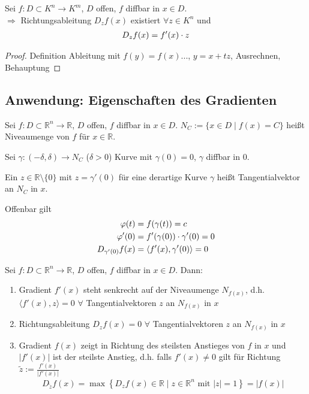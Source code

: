 \begin{proposition}
	Sei $f:D\subset K^n\to K^m$, $D$ offen, $f$ diffbar in $x\in D$.\\
	$\Rightarrow$ Richtungsableitung $D_zf(x)$ existiert $\forall z\in K^n$ und 
	\begin{align}
		D_zf(x) = f'(x) \cdot z\notag
	\end{align}
\end{proposition}

\begin{proof}
	Definition Ableitung mit $f(y) = f(x) ...$, $y=x+tz$, Ausrechnen, Behauptung
\end{proof}

\subsection{Anwendung: Eigenschaften des Gradienten}
\begin{*definition}[Niveaumenge]
	Sei $f:D\subset\mathbb{R}^n\to \mathbb{R}$, $D$ offen, $f$ diffbar in $x\in D$.
	$N_C:= \{ x\in D \mid f(x) = C \}$ heißt Niveaumenge von $f$ für $x\in \mathbb{R}$.
\end{*definition}	

\begin{*definition}[Tangentialvektor]
	Sei $\gamma: (-\delta, \delta)\to N_C$ ($\delta > 0$) Kurve mit $\gamma(0) = 0$, $\gamma$ diffbar in $0$.
	
	Ein $z\in\mathbb{R}\setminus \{0\}$ mit $z = \gamma'(0)$ für eine derartige Kurve $\gamma$ heißt Tangentialvektor an $N_C$ in $x$.
	
	Offenbar gilt
	\begin{align}
		\phi(t) &= f(\gamma(t)) = c \notag \\
		\phi'(0) &= f'(\gamma(0))\cdot \gamma'(0) = 0 \notag \\
		D_{\gamma'(0)}f(x) &= \langle f'(x),\gamma'(0)\rangle = 0\notag
	\end{align}
\end{*definition}

\begin{proposition}
	Sei $f:D\subset\mathbb{R}^n\to\mathbb{R}$, $D$ offen, $f$ \gls{diffbar} in $x\in D$. Dann:
\begin{enumerate}[label={\arabic*)}]
	\item Gradient $f'(x)$ steht senkrecht auf der Niveaumenge $N_{f(x)}$, d.h. $\langle f'(x), z\rangle = 0$ $\forall$ Tangentialvektoren $z$ an $N_{f(x)}$ in $x$
	\item Richtungsableitung $D_zf(x) = 0$ $\forall$ Tangentialvektoren $z$ an $N_{f(x)}$ in $x$
	\item Gradient $f(x)$ zeigt in Richtung des steilsten Anstieges von $f$ in $x$ und $\vert f'(x)\vert$ ist der steilste Anstieg, d.h. falls $f'(x)\neq 0$ gilt für Richtung $\tilde{z} := \frac{f'(x)}{\vert f'(x)\vert}$ \begin{align*}
		D_{\tilde{z}} f(x) = \max \left\lbrace D_z f(x) \in\mathbb{R} \mid z\in\mathbb{R}^n \text{ mit } \vert z \vert = 1 \right\rbrace = \vert f(x)\vert
	\end{align*}
\end{enumerate}
\end{proposition}

